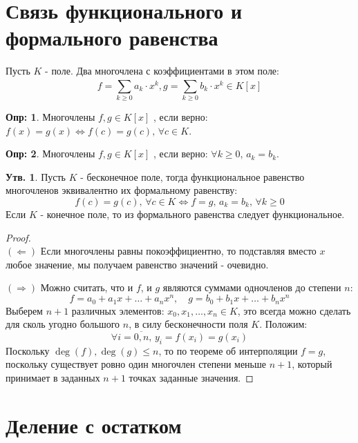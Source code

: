 \documentclass[12pt]{article}
\newcommand{\RN}[1]{%
	\textup{\uppercase\expandafter{\romannumeral#1}}%
}
\theoremstyle{definition}
\newtheorem{defn}{Опр:}
\newtheorem{prop}{Утв.}
\newcommand{\ddsum}[2]{\displaystyle\sum\limits_{#1}^{#2}}
\begin{document}
\lhead{Алгебра-\RN{1}}

\section*{Связь функционального и формального равенства}

Пусть $K$ - поле. Два многочлена с коэффициентами в этом поле:
$$
	f = \ddsum{k \geq 0}{}a_k{\cdot}x^k, g = \ddsum{k \geq 0}{}b_k{\cdot}x^k \in K[x]
$$
\begin{defn}
	Многочлены $f,g \in K[x]$ , если верно: $f(x) = g(x) \Leftrightarrow f(c) = g(c), \, \forall c \in K$.
\end{defn}
\begin{defn}
	Многочлены $f,g \in K[x]$ , если верно: $\forall k \geq 0, \, a_k = b_k$.
\end{defn}

\begin{prop}
	Пусть $K$ - бесконечное поле, тогда функциональное равенство многочленов эквивалентно их формальному равенству: 
	$$
		f(c) = g(c), \, \forall c \in K \Leftrightarrow f = g, \, a_k = b_k, \, \forall k \geq 0
	$$
	Если $K$ - конечное поле, то из формального равенства следует функциональное.
\end{prop}
\begin{proof}\hfill\\
	$(\Leftarrow)$ Если многочлены равны покоэффициентно, то подставляя вместо $x$ любое значение, мы получаем равенство значений - очевидно.
	
	$(\Rightarrow)$ Можно считать, что и $f$, и $g$ являются суммами одночленов до степени $n$:
	$$
		f = a_0 + a_1x + \dotsc + a_nx^n, \quad
		g = b_0 + b_1x + \dotsc + b_nx^n
	$$
	Выберем $n+1$ различных элементов: $x_0, x_1,\dotsc, x_n \in K$, это всегда можно сделать для сколь угодно большого $n$, в силу бесконечности поля $K$. Положим: 
	$$
		\forall i = \overline{0,n}, \, y_i = f(x_i) = g(x_i)
	$$
	Поскольку $\deg(f), \deg(g) \leq n$, то по теореме об интерполяции $f = g$, поскольку существует ровно один многочлен степени меньше $n + 1$, который принимает в заданных $n+1$ точках заданные значения.
\end{proof}

\section*{Деление с остатком}
\end{document}
